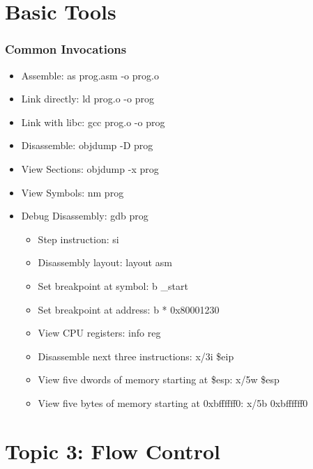 \documentclass[11pt,xcolor=dvipsnames]{beamer}
\begin{document}
\section{Basic Tools}
\begin{frame}[fragile,t]
\frametitle{Common Invocations}
\begin{itemize}
    \item Assemble: {\ttfamily as prog.asm -o prog.o}
    \item Link directly: {\ttfamily ld prog.o -o prog}
    \item Link with libc: {\ttfamily gcc prog.o -o prog}
    \item Disassemble: {\ttfamily objdump -D prog}
    \item View Sections: {\ttfamily objdump -x prog}
    \item View Symbols: {\ttfamily nm prog}
    \item Debug Disassembly: {\ttfamily gdb prog}
    \begin{itemize}
        \item Step instruction: {\ttfamily si}
        \item Disassembly layout: {\ttfamily layout asm}
        \item Set breakpoint at symbol: {\ttfamily b \_start}
        \item Set breakpoint at address: {\ttfamily b * 0x80001230}
        \item View CPU registers: {\ttfamily info reg}
        \item Disassemble next three instructions: {\ttfamily x/3i \$eip}
        \item View five dwords of memory starting at {\ttfamily \$esp}: {\ttfamily x/5w \$esp}
        \item View five bytes of memory starting at {\ttfamily 0xbffffff0}: {\ttfamily x/5b 0xbffffff0}
    \end{itemize}
\end{itemize}
\end{frame}

\section{Topic 3: Flow Control}
\end{document}
